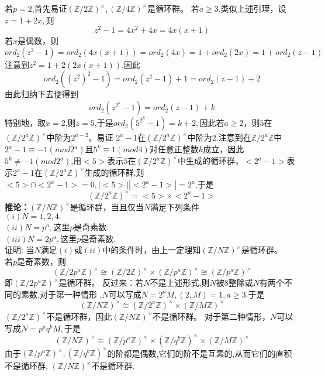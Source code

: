 \documentclass[UTF8]{article}
\begin{document}
 若$p=2$,首先易证$(\mathbb{Z}/2\mathbb{Z})^{\times},(\mathbb{Z}/4\mathbb{Z})^{\times}$是循环群。
 若$a\geq 3$,类似上述引理，设$z=1+2x,$则$$
 z^{2}-1=4x^{2}+4x=4x(x+1)
 $$
	若$x$是偶数，则
	$$
	ord_{2}(z^{2}-1)=ord_{2}(4x(x+1))=ord_{2}(4x)=1+ord_{2}(2x)=1+ord_{2}(z-1)
	$$
	注意到$z^{2}=1+2(2x(x+1))$,因此
	$$
	ord_{2}((z^{2})^{2}-1)=ord_{2}(z^{2}-1)+1=ord_{2}(z-1)+2
	$$
	由此归纳下去便得到
	$$
	ord_{2}(z^{2^{k}}-1)=ord_{2}(z-1)+k
	$$
	特别地，取$x=2$,则$z=5$,于是$ord_{2}(5^{2^{k}}-1)=k+2,$因此若$a\geq 2$，则$5$在$(\mathbb{Z}/2^{a}\mathbb{Z})^{\times}$中阶为$2^{a-2}$。易证
	$2^{a}-1$在$(\mathbb{Z}/2^{a}\mathbb{Z})^{\times}$中阶为$2$.注意到在$\mathbb{Z}/2^{a}\mathbb{Z}$中$2^{a}-1\equiv -1(mod 2^{a})$且$5^{k}\equiv 1(mod4)$对任意正整数$k$成立，因此$5^{k}\neq -1(mod 2^{a})$,用$<5>$表示$5$在$(\mathbb{Z}/2^{a}\mathbb{Z})^{\times}$中生成的循环群，$<2^{a}-1>$表示$2^{a}-1$在$(\mathbb{Z}/2^{a}\mathbb{Z})^{\times}$生成的循环群,则$<5>\cap <2^{a}-1>=0,|<5>||<2^{a}-1>|=2^{a}$,于是$$(\mathbb{Z}/2^{a}\mathbb{Z})^{\times}=<5>\times<2^{a}-1>$$
\textbf{推论：}$(\mathbb{Z}/N\mathbb{Z})^{\times}$是循环群，当且仅当$N$满足下列条件\\
$(i)$$N=1,2,4.$\\
$(ii)N=p^{a},$这里$p$是奇素数.\\
$(iii)N=2p^{a},$这里$p$是奇素数.\\
证明:
当$N$满足$(i)$或$(ii)$中的条件时，由上一定理知$(\mathbb{Z}/N\mathbb{Z})^{\times}$是循环群。\\
若$p$是奇素数，则
$$
(\mathbb{Z}/2p^{a}\mathbb{Z})^{\times}\cong (\mathbb{Z}/2\mathbb{Z})^{\times}\times(\mathbb{Z}/p^{a}\mathbb{Z})^{\times}\cong (\mathbb{Z}/p^{a}\mathbb{Z})^{\times}
$$
即$(\mathbb{Z}/2p^{a}\mathbb{Z})^{\times}$是循环群。
反过来：若$N$不是上述形式,则$N$被$8$整除或$N$有两个不同的素数,对于第一种情形
,$N$可以写成$N=2^{a}M,(2,M)=1,a\geq 3.$于是
$$
(\mathbb{Z}/N\mathbb{Z})^{\times}\cong (\mathbb{Z}/2^{a}\mathbb{Z})^{\times}\times (\mathbb{Z}/M\mathbb{Z})^{\times}
$$
$(\mathbb{Z}/2^{a}\mathbb{Z})^{\times}$不是循环群，因此$(\mathbb{Z}/N\mathbb{Z})^{\times}$不是循环群。
对于第二种情形，$N$可以写成$N=p^{a}q^{b}M,$于是
$$
(\mathbb{Z}/N\mathbb{Z})^{\times}\cong (\mathbb{Z}/p^{a}\mathbb{Z})^{\times}\times (\mathbb{Z}/q^{b}\mathbb{Z})^{\times}\times (\mathbb{Z}/M\mathbb{Z})^{\times}
$$
由于$(\mathbb{Z}/p^{a}\mathbb{Z})^{\times},(\mathbb{Z}/q^{b}\mathbb{Z})^{\times}$的阶都是偶数,它们的阶不是互素的,从而它们的直积不是循环群,
$(\mathbb{Z}/N\mathbb{Z})^{\times}$不是循环群.\\
\end{document}
